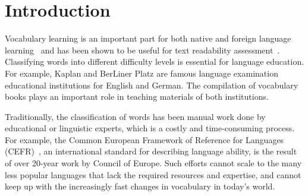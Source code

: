 \section{Introduction}
\label{sec:intro}

Vocabulary learning is an important part for both native and 
foreign language learning~\cite{grabe1991current} 
and has been shown to be useful for text readability assessment~\cite{nation2001learning,manyak2009english,qian2002investigating}. 
Classifying words into different difficulty levels is essential for language education.
For example, Kaplan and BerLiner Platz are famous language examination educational institutions for English and German.
The compilation of vocabulary books plays an important role in teaching materials of both institutions.

Traditionally, the classification of words has been manual work done by
educational or linguistic experts, which is a costly and  time-consuming
process. For example, the Common European Framework of 
Reference for Languages  (CEFR)~\cite{little2006common, little2011common}, 
an international standard for describing language ability, is the result 
of over 20-year work by Council of Europe. 
Such efforts cannot scale to the many less popular languages that lack the required resources and expertise, and cannot keep up with the increasingly fast changes in vocabulary in today's world.


